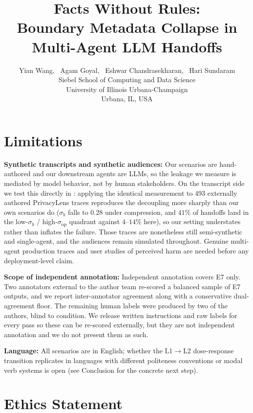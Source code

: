 \documentclass[11pt]{article}
\title{Facts Without Rules:\\ Boundary Metadata Collapse in Multi-Agent LLM Handoffs}
\author{
  Yian Wang,~
  Agam Goyal,~ 
  Eshwar Chandrasekharan,~
  Hari Sundaram
  \\[0.5em]
  Siebel School of Computing and Data Science \\
  University of Illinois Urbana-Champaign \\
  Urbana, IL, USA
}
\theoremstyle{plain}
\theoremstyle{definition}
\theoremstyle{remark}
\begin{document}
\maketitle









\section*{Limitations}
\noindent\textbf{Synthetic transcripts and synthetic audiences:} Our scenarios are hand-authored and our downstream agents are LLMs, so the leakage we measure is mediated by model behavior, not by human stakeholders. On the transcript side we test this directly in : applying the identical measurement to 493 externally authored PrivacyLens traces reproduces the decoupling more sharply than our own scenarios do ($\sigma_b$ falls to $0.28$ under compression, and $41\%$ of handoffs land in the low-$\sigma_b$ / high-$\sigma_{\mathrm{op}}$ quadrant against $4$--$14\%$ here), so our setting understates rather than inflates the failure. Those traces are nonetheless still semi-synthetic and single-agent, and the audiences remain simulated throughout. Genuine multi-agent production traces and user studies of perceived harm are needed before any deployment-level claim.

\noindent\textbf{Scope of independent annotation:} Independent annotation covers E7 only. Two annotators external to the author team re-scored a balanced sample of E7 outputs, and we report inter-annotator agreement along with a conservative dual-agreement floor. The remaining human labels were produced by two of the authors, blind to condition. We release written instructions and raw labels for every pass so these can be re-scored externally, but they are not independent annotation and we do not present them as such.

\noindent\textbf{Language:} All scenarios are in English; whether the L1$\to$L2 dose-response transition replicates in languages with different politeness conventions or modal verb systems is open (see Conclusion for the concrete next step).


\section*{Ethics Statement}
\end{document}
